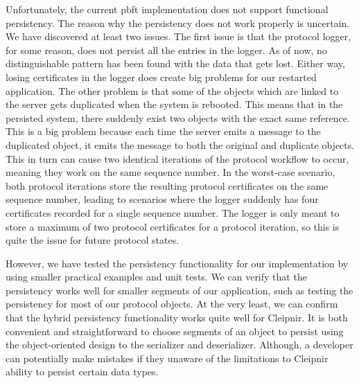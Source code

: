 Unfortunately, the current \ac{pbft} implementation does not support functional persistency. The reason why the persistency does not work properly is uncertain. We have discovered at least two issues. The first issue is that the protocol logger, for some reason, does not persist all the entries in the logger. As of now, no distinguishable pattern has been found with the data that gets lost. Either way, losing certificates in the logger does create big problems for our restarted application. The other problem is that some of the  objects which are linked to the server gets duplicated when the system is rebooted. This means that in the persisted system, there suddenly exist two  objects with the exact same reference. This is a big problem because each time the server emits a message to the duplicated  object, it emits the message to both the original and duplicate  objects. This in turn can cause two identical iterations of the protocol workflow to occur, meaning they work on the same sequence number. In the worst-case scenario, both protocol iterations store the resulting protocol certificates on the same sequence number, leading to scenarios where the logger suddenly has four certificates recorded for a single sequence number. The logger is only meant to store a maximum of two protocol certificates for a protocol iteration, so this is quite the issue for future protocol states.

However, we have tested the persistency functionality for our implementation by using smaller practical examples and unit tests. We can verify that the persistency works well for smaller segments of our application, such as testing the persistency for most of our protocol objects.
At the very least, we can confirm that the hybrid persistency functionality works quite well for Cleipnir. It is both convenient and straightforward to choose segments of an object to persist using the object-oriented design to the serializer and deserializer. Although, a developer can potentially make mistakes if they unaware of the limitations to Cleipnir ability to persist certain data types.